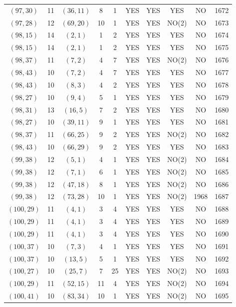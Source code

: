 \begin{longtable}{|c|c|c|c|c|c|c|c|c|c|}
$(97, 30)$ & 11 & $(36, 11)$ & 8 & 1 & YES & YES & YES & NO & 1672\\
$(97, 28)$ & 12 & $(69, 20)$ & 10 & 1 & YES & YES & NO(2) & NO & 1673\\
$(98, 15)$ & 14 & $(2, 1)$ & 1 & 2 & YES & YES & YES & NO & 1674\\
$(98, 15)$ & 14 & $(2, 1)$ & 1 & 2 & YES & YES & YES & NO & 1675\\
$(98, 37)$ & 11 & $(7, 2)$ & 4 & 7 & YES & YES & NO(2) & NO & 1676\\
$(98, 43)$ & 10 & $(7, 2)$ & 4 & 7 & YES & YES & YES & NO & 1677\\
$(98, 43)$ & 10 & $(8, 3)$ & 4 & 2 & YES & YES & YES & NO & 1678\\
$(98, 27)$ & 10 & $(9, 4)$ & 5 & 1 & YES & YES & YES & NO & 1679\\
$(98, 31)$ & 13 & $(16, 5)$ & 7 & 2 & YES & YES & YES & NO & 1680\\
$(98, 27)$ & 10 & $(39, 11)$ & 9 & 1 & YES & YES & YES & NO & 1681\\
$(98, 37)$ & 11 & $(66, 25)$ & 9 & 2 & YES & YES & NO(2) & NO & 1682\\
$(98, 43)$ & 10 & $(66, 29)$ & 9 & 2 & YES & YES & YES & NO & 1683\\
$(99, 38)$ & 12 & $(5, 1)$ & 4 & 1 & YES & YES & NO(2) & NO & 1684\\
$(99, 38)$ & 12 & $(7, 1)$ & 6 & 1 & YES & YES & NO(2) & NO & 1685\\
$(99, 38)$ & 12 & $(47, 18)$ & 8 & 1 & YES & YES & NO(2) & NO & 1686\\
$(99, 38)$ & 12 & $(73, 28)$ & 10 & 1 & YES & YES & NO(2) & 1968 & 1687\\
$(100, 29)$ & 11 & $(4, 1)$ & 3 & 4 & YES & YES & YES & NO & 1688\\
$(100, 29)$ & 11 & $(4, 1)$ & 3 & 4 & YES & YES & YES & NO & 1689\\
$(100, 29)$ & 11 & $(4, 1)$ & 3 & 4 & YES & YES & YES & NO & 1690\\
$(100, 37)$ & 10 & $(7, 3)$ & 4 & 1 & YES & YES & YES & NO & 1691\\
$(100, 37)$ & 10 & $(13, 5)$ & 5 & 1 & YES & YES & YES & NO & 1692\\
$(100, 27)$ & 10 & $(25, 7)$ & 7 & 25 & YES & YES & NO(2) & NO & 1693\\
$(100, 29)$ & 11 & $(52, 15)$ & 11 & 4 & YES & YES & NO(2) & NO & 1694\\
$(100, 41)$ & 10 & $(83, 34)$ & 10 & 1 & YES & YES & NO(2) & NO & 1695\\

\end{longtable}
